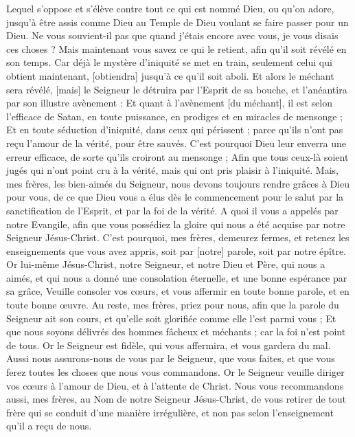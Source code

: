 \begin{multicols}{2}
Lequel s'oppose et s'élève contre tout ce qui est nommé Dieu, ou qu'on adore, jusqu'à être assis comme Dieu au Temple de Dieu voulant se faire passer pour un Dieu.
Ne vous souvient-il pas que quand j'étais encore avec vous, je vous disais ces choses ?
Mais maintenant vous savez ce qui le retient, afin qu'il soit révélé en son temps.
Car déjà le mystère d'iniquité se met en train, seulement celui qui obtient maintenant, [obtiendra] jusqu'à ce qu'il soit aboli.
Et alors le méchant sera révélé, [mais] le Seigneur le détruira par l'Esprit de sa bouche, et l'anéantira par son illustre avènement :
Et quant à l'avènement [du méchant], il est selon l'efficace de Satan, en toute puissance, en prodiges et en miracles de mensonge ;
Et en toute séduction d'iniquité, dans ceux qui périssent ; parce qu'ils n'ont pas reçu l'amour de la vérité, pour être sauvés.
C'est pourquoi Dieu leur enverra une erreur efficace, de sorte qu'ils croiront au mensonge ;
Afin que tous ceux-là soient jugés qui n'ont point cru à la vérité, mais qui ont pris plaisir à l'iniquité.
Mais, mes frères, les bien-aimés du Seigneur, nous devons toujours rendre grâces à Dieu pour vous, de ce que Dieu vous a élus dès le commencement pour le salut par la sanctification de l'Esprit, et par la foi de la vérité.
A quoi il vous a appelés par notre Evangile, afin que vous possédiez la gloire qui nous a été acquise par notre Seigneur Jésus-Christ.
C'est pourquoi, mes frères, demeurez fermes, et retenez les enseignements que vous avez appris, soit par [notre] parole, soit par notre épître.
Or lui-même Jésus-Christ, notre Seigneur, et notre Dieu et Père, qui nous a aimés, et qui nous a donné une consolation éternelle, et une bonne espérance par sa grâce,
Veuille consoler vos cœurs, et vous affermir en toute bonne parole, et en toute bonne œuvre.
\VerseOne{}Au reste, mes frères, priez pour nous, afin que la parole du Seigneur ait son cours, et qu'elle soit glorifiée comme elle l'est parmi vous ;
Et que nous soyons délivrés des hommes fâcheux et méchants ; car la foi n'est point de tous.
Or le Seigneur est fidèle, qui vous affermira, et vous gardera du mal.
Aussi nous assurons-nous de vous par le Seigneur, que vous faites, et que vous ferez toutes les choses que nous vous commandons.
Or le Seigneur veuille diriger vos cœurs à l'amour de Dieu, et à l'attente de Christ.
Nous vous recommandons aussi, mes frères, au Nom de notre Seigneur Jésus-Christ, de vous retirer de tout frère qui se conduit d'une manière irrégulière, et non pas selon l'enseignement qu'il a reçu de nous.

\end{multicols}
